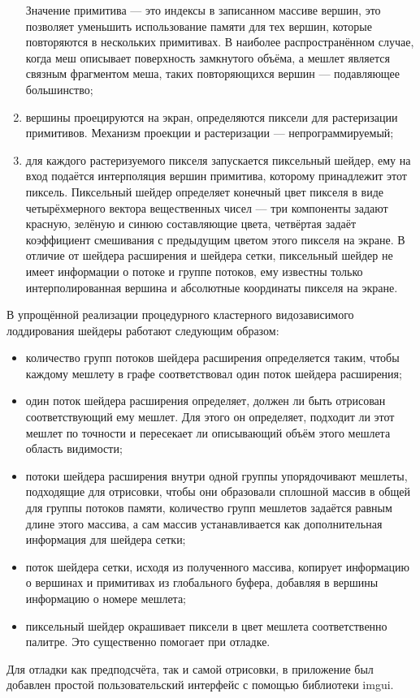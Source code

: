 \begin{enumerate}
    Значение примитива --- это индексы в записанном массиве вершин, это позволяет уменьшить использование памяти для тех вершин, которые повторяются в нескольких примитивах.
    В наиболее распространённом случае, когда меш описывает поверхность замкнутого объёма, а мешлет является связным фрагментом меша, таких повторяющихся вершин --- подавляющее большинство;

    \item вершины проецируются на экран, определяются пиксели для растеризации примитивов.
    Механизм проекции и растеризации --- непрограммируемый;

    \item для каждого растеризуемого пикселя запускается пиксельный шейдер, ему на вход подаётся интерполяция вершин примитива, которому принадлежит этот пиксель.
    Пиксельный шейдер определяет конечный цвет пикселя в виде четырёхмерного вектора вещественных чисел --- три компоненты задают красную, зелёную и синюю составляющие цвета, четвёртая задаёт коэффициент смешивания с предыдущим цветом этого пикселя на экране.
    В отличие от шейдера расширения и шейдера сетки, пиксельный шейдер не имеет информации о потоке и группе потоков, ему известны только интерполированная вершина и абсолютные координаты пикселя на экране.
\end{enumerate}

В упрощённой реализации процедурного кластерного видозависимого лоддирования шейдеры работают следующим образом:
\begin{itemize}
    \item количество групп потоков шейдера расширения определяется таким, чтобы каждому мешлету в графе соответствовал один поток шейдера расширения;
    \item один поток шейдера расширения определяет, должен ли быть отрисован соответствующий ему мешлет.
    Для этого он определяет, подходит ли этот мешлет по точности и пересекает ли описывающий объём этого мешлета область видимости;
    \item потоки шейдера расширения внутри одной группы упорядочивают мешлеты, подходящие для отрисовки, чтобы они образовали сплошной массив в общей для группы потоков памяти, количество групп мешлетов задаётся равным длине этого массива, а сам массив устанавливается как дополнительная информация для шейдера сетки;
    \item поток шейдера сетки, исходя из полученного массива, копирует информацию о вершинах и примитивах из глобального буфера, добавляя в вершины информацию о номере мешлета;
    \item пиксельный шейдер окрашивает пиксели в цвет мешлета соответственно палитре.
    Это существенно помогает при отладке.
\end{itemize}

Для отладки как предподсчёта, так и самой отрисовки, в приложение был добавлен простой пользовательский интерфейс с помощью библиотеки imgui.
